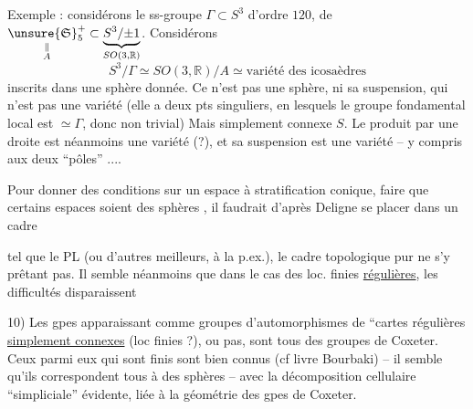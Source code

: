 Exemple : considérons le ss-groupe $\Gamma\subset S^3$ d'ordre $120$,  de $\underset{\substack{\Vert\\ A}}{\unsure{\mathfrak S}_5^+}\subset\underbrace{S^3/\mathord{\pm}1}_{SO(3,\mathbb R)}$. Considérons
\[
S^3/\Gamma\simeq SO(3,\mathbb R)/A\simeq\text{variété des icosaèdres}
\]
 inscrits dans une sphère donnée. Ce n'est pas une sphère, ni sa suspension, qui n'est pas une variété (elle a deux pts singuliers, en lesquels le groupe fondamental local est $\simeq\Gamma$, donc non trivial) Mais    simplement connexe $S$.   Le produit par une droite est néanmoins une variété (?), et sa suspension est une variété  -- y compris aux deux ``pôles'' ....


Pour donner des conditions   sur un espace à stratification  conique,   faire que certains espaces soient des sphères , il faudrait d'après Deligne se placer dans un cadre


tel que le PL (ou d'autres meilleurs, à la  p.ex.), le cadre topologique pur ne s'y prêtant pas. Il semble néanmoins que dans le cas des  loc. finies \uline{régulières}, les difficultés disparaissent 

10) Les gpes apparaissant comme groupes d'automorphismes de ``cartes régulières  \uline{simplement connexes} (loc finies ?),   ou pas, sont tous des groupes de Coxeter. Ceux parmi eux qui sont finis sont bien connus (cf livre Bourbaki) -- il semble qu'ils correspondent tous à des sphères -- avec la décomposition cellulaire ``simpliciale'' évidente, liée à la géométrie des gpes de Coxeter.

